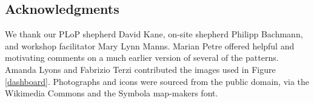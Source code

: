 \subsection*{Acknowledgments}
We thank our PLoP shepherd David Kane, on-site shepherd Philipp
Bachmann, and workshop facilitator Mary Lynn Manns.  Marian Petre
offered helpful and motivating comments on a much earlier version of
several of the patterns.  Amanda Lyons and Fabrizio Terzi contributed
the images used in Figure \ref{dashboard}.  Photographs and icons were
sourced from the public domain, via the Wikimedia Commons and the
Symbola map-makers font.











